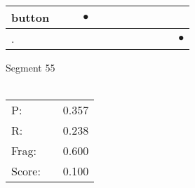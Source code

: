 \documentclass[landscape]{article}
\newcommand{\ssp}{\hspace{2pt}}
\newcommand{\mex}{\cellcolor{g}$\bullet$}
\begin{document}
\begin{tabular}{|l|p{10pt}|p{10pt}|p{10pt}|p{10pt}|p{10pt}|p{10pt}|p{10pt}|p{10pt}|p{10pt}|p{10pt}|p{10pt}|}
\hline
\ssp \cellcolor{ref2}button \ssp&\hspace{2pt}&\hspace{2pt}&\hspace{2pt}\mex&\hspace{2pt}&\hspace{2pt}&\hspace{2pt}&\hspace{2pt}&\hspace{2pt}&\hspace{2pt}&\hspace{2pt}&\hspace{2pt}\\
\hline
\ssp \cellcolor{ref10}. \ssp&\hspace{2pt}&\hspace{2pt}&\hspace{2pt}&\hspace{2pt}&\hspace{2pt}&\hspace{2pt}&\hspace{2pt}&\hspace{2pt}&\hspace{2pt}&\hspace{2pt}&\hspace{2pt}\mex\\
\hline
\end{tabular}

\vspace{6pt}
\noindent Segment 55\\\\
\noindent\begin{tabular}{lm{12pt}r}
\hline
P:&&0.357\\
R:&&0.238\\
Frag:&&0.600\\
Score:&&0.100\\
\end{tabular}

\newpage
\end{document}
